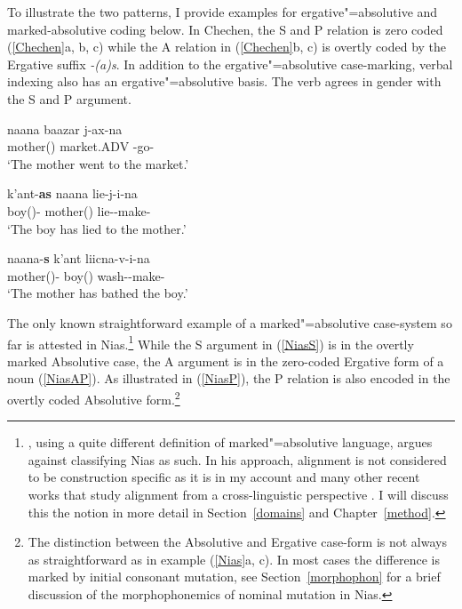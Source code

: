To illustrate the two patterns, I provide examples for ergative"=absolutive and marked-absolutive coding below.
In Chechen, the S and P relation is zero coded (\ref{Chechen}a, b, c) while the A relation in (\ref{Chechen}b, c) is overtly coded by the Ergative suffix \emph{-(a)s}.
In addition to the ergative"=absolutive case-marking, verbal indexing also has an ergative"=absolutive basis. 
The verb agrees in gender with the S and P argument. 

\pagebreak
\begin{exe}\ex\label{Chechen}
\begin{xlist}\ex\label{ChechenS}\gll naana baazar j-ax-na\\
mother(\fem{}) market.ADV \fem{}-go-\prf{}\\
\glt `The mother went to the market.'

\ex\gll k'ant-\textbf{as} naana lie-j-i-na\\
boy(\mas{})-{\erg{}} mother(\fem{}) lie-\fem{}-make-\prf{}\\
\glt `The boy has lied to the mother.'

\ex\gll naana-\textbf{s} k'ant liicna-v-i-na\\
mother(\fem{})-{\erg{}} boy(\mas{}) wash-\mas{}-make-\prf{}\\
\glt `The mother has bathed the boy.'
\end{xlist}
  \end{exe}

The only known straightforward example of a marked"=absolutive case-system so far is attested in Nias.\footnote{\citet{Crysmann:2009}, using a quite different definition of marked"=absolutive language, argues against classifying Nias as such. 
In his approach, alignment is not considered to be construction specific as it is in my account and many other recent works that study alignment from a cross-linguistic perspective \citep[cf. among others][]{Bickel.align}. 
I will discuss this the notion in more detail in Section~\ref{domains} and Chapter~\ref{method}.} 
While the S argument in (\ref{NiasS}) is in the overtly marked Absolutive case, the A argument is in the zero-coded Ergative form of a noun (\ref{NiasAP}). 
As illustrated in (\ref{NiasP}), the P relation is also encoded in the overtly coded Absolutive form.\footnote{The distinction between the Absolutive and Ergative case-form is not always as straightforward as in example (\ref{Nias}a, c). 
In most cases the difference is marked by initial consonant mutation, see Section~\ref{morphophon} for a brief discussion of the morphophonemics of nominal mutation in Nias.}
  
